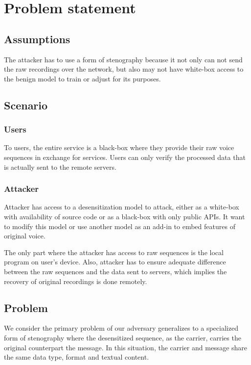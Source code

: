 \documentclass[journal]{IEEEtran} %
\begin{document}
\section{Problem statement}
\label{seg:problem}

\subsection{Assumptions}

The attacker has to use a form of stenography because it not only can not send the raw recordings over the network, but also may not have white-box access to the benign model to train or adjust for its purposes.

\subsection{Scenario}

\subsubsection{Users}

To users, the entire service is a black-box where they provide their raw voice sequences in exchange for services. Users can only verify the processed data that is actually sent to the remote servers.

\subsubsection{Attacker}

Attacker has access to a desensitization model to attack, either as a white-box with availability of source code or as a black-box with only public APIs. It want to modify this model or use another model as an add-in to embed features of original voice.

The only part where the attacker has access to raw sequences is the local program on user's device. Also, attacker has to ensure adequate difference between the raw sequences and the data sent to servers, which implies the recovery of original recordings is done remotely.

\subsection{Problem}

We consider the primary problem of our adversary generalizes to a specialized form of stenography where the desensitized sequence, as the carrier, carries the original counterpart the message. In this situation, the carrier and message share the same data type, format and textual content.
\end{document}
